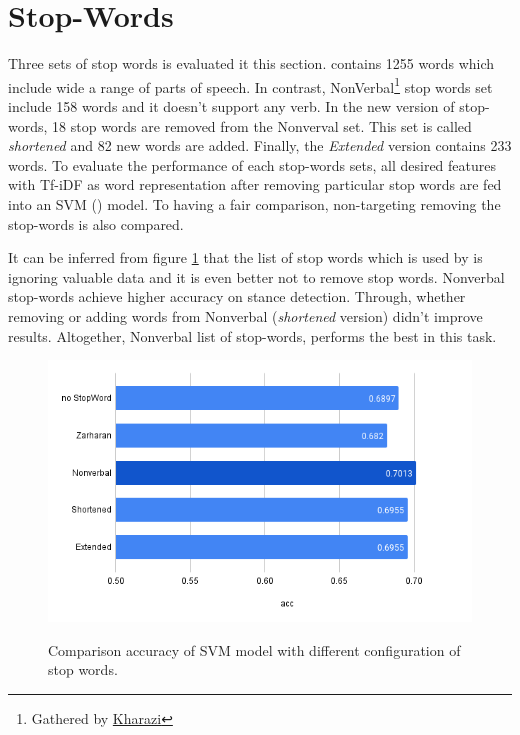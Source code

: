\section{Stop-Words}
Three sets of stop words is evaluated it this section. \cite{stance_persian} contains 1255 words which include wide a range of parts of speech. In contrast, NonVerbal\footnote{Gathered by \href{github.com/kharazi/persian-stopwords}{Kharazi}} stop words set include 158 words and it doesn't support any verb. In the new version of stop-words, 18 stop words are removed from the Nonverval set. This set is called \textit{shortened} and 82 new words are added. Finally, the \textit{Extended} version contains 233 words. To evaluate the performance of each stop-words sets, all desired features with Tf-iDF as word representation after removing particular stop words are fed into an SVM (\cite{svc}) model. To having a fair comparison, non-targeting removing the stop-words is also compared. 

It can be inferred from figure \ref{fig:stopwords} that the list of stop words which is used by \cite{stance_persian} is ignoring valuable data and it is even better not to remove stop words. Nonverbal stop-words achieve higher accuracy on stance detection. Through, whether removing or adding words from Nonverbal (\textit{shortened} version) didn't improve results. Altogether, Nonverbal list of stop-words, performs the best in this task.

\begin{figure}%
	\centering
	{\includegraphics[width=12.5cm]{statistics/AccuracyScore.png} }
	\caption{Comparison accuracy of SVM model with different configuration of stop words.}%
	\label{fig:stopwords}%
\end{figure}

